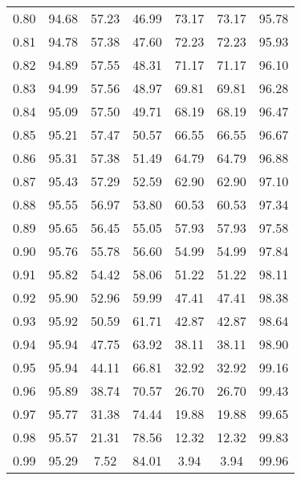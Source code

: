 \begin{tabular}{|c|c|c|c|c|c|c|}
      0.80 &     94.68 &     57.23 &      46.99 &   73.17 &      73.17 &         95.78 \\
      0.81 &     94.78 &     57.38 &      47.60 &   72.23 &      72.23 &         95.93 \\
      0.82 &     94.89 &     57.55 &      48.31 &   71.17 &      71.17 &         96.10 \\
      0.83 &     94.99 &     57.56 &      48.97 &   69.81 &      69.81 &         96.28 \\
      0.84 &     95.09 &     57.50 &      49.71 &   68.19 &      68.19 &         96.47 \\
      0.85 &     95.21 &     57.47 &      50.57 &   66.55 &      66.55 &         96.67 \\
      0.86 &     95.31 &     57.38 &      51.49 &   64.79 &      64.79 &         96.88 \\
      0.87 &     95.43 &     57.29 &      52.59 &   62.90 &      62.90 &         97.10 \\
      0.88 &     95.55 &     56.97 &      53.80 &   60.53 &      60.53 &         97.34 \\
      0.89 &     95.65 &     56.45 &      55.05 &   57.93 &      57.93 &         97.58 \\
      0.90 &     95.76 &     55.78 &      56.60 &   54.99 &      54.99 &         97.84 \\
      0.91 &     95.82 &     54.42 &      58.06 &   51.22 &      51.22 &         98.11 \\
      0.92 &     95.90 &     52.96 &      59.99 &   47.41 &      47.41 &         98.38 \\
      0.93 &     95.92 &     50.59 &      61.71 &   42.87 &      42.87 &         98.64 \\
      0.94 &     95.94 &     47.75 &      63.92 &   38.11 &      38.11 &         98.90 \\
      0.95 &     95.94 &     44.11 &      66.81 &   32.92 &      32.92 &         99.16 \\
      0.96 &     95.89 &     38.74 &      70.57 &   26.70 &      26.70 &         99.43 \\
      0.97 &     95.77 &     31.38 &      74.44 &   19.88 &      19.88 &         99.65 \\
      0.98 &     95.57 &     21.31 &      78.56 &   12.32 &      12.32 &         99.83 \\
      0.99 &     95.29 &      7.52 &      84.01 &    3.94 &       3.94 &         99.96 \\
\bottomrule
\end{tabular}
